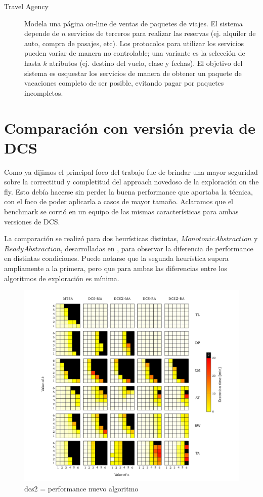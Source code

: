 \begin{description}
    \item [Travel Agency] Modela una página on-line de ventas de paquetes de viajes. El sistema depende de $n$ servicios de terceros para realizar las reservas (ej. alquiler de auto, compra de pasajes, etc). Los protocolos para utilizar los servicios pueden variar de manera no controlable; una variante es la selección de hasta $k$ atributos (ej. destino del vuelo, clase y fechas). El objetivo del sistema es osquestar los servicios de manera de obtener un paquete de vacaciones completo de ser posible, evitando pagar por paquetes incompletos.
\end{description}

\section{Comparación con versión previa de DCS}
Como ya dijimos el principal foco del trabajo fue de brindar una mayor seguridad sobre la correctitud y completitud del approach novedoso de la exploración on the fly. Esto debía hacerse sin perder la buena performance que aportaba la técnica, con el foco de poder aplicarla a casos de mayor tamaño. Aclaramos que el benchmark se corrió en un equipo de las mismas características para ambas versiones de DCS.

La comparación se realizó para dos heurísticas distintas, $Monotonic Abstraction$ y $Ready Abstraction$, desarrolladas en \cite{tesisDani}, para observar la diferencia de performance en distintas condiciones. Puede notarse que la segunda heurística supera ampliamente a la primera, pero que para ambas las diferencias entre los algoritmos de exploración es mínima.

\begin{figure}[htb]
    \centering
    \includegraphics[width=\linewidth]{figures/dcs_vs.pdf}  
    \caption{dcs2 = performance nuevo algoritmo}
    \label{fig:dcs_vs}
\end{figure}


